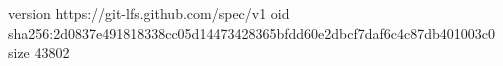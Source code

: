 version https://git-lfs.github.com/spec/v1
oid sha256:2d0837e491818338cc05d14473428365bfdd60e2dbcf7daf6c4c87db401003c0
size 43802
